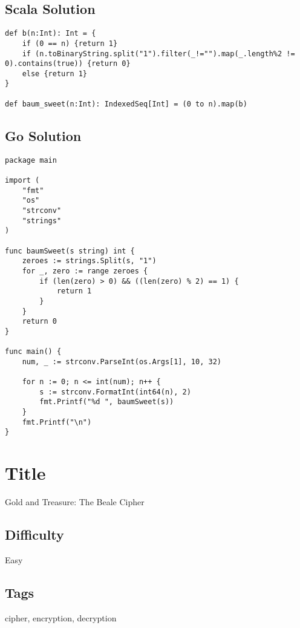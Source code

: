 \subsection{Scala Solution}\label{scala-solution-11}

\begin{verbatim}
def b(n:Int): Int = {
    if (0 == n) {return 1}
    if (n.toBinaryString.split("1").filter(_!="").map(_.length%2 != 0).contains(true)) {return 0}
    else {return 1}
}

def baum_sweet(n:Int): IndexedSeq[Int] = (0 to n).map(b)
\end{verbatim}

\subsection{Go Solution}\label{go-solution}

\begin{verbatim}
package main

import (
    "fmt"
    "os"
    "strconv"
    "strings"
)

func baumSweet(s string) int {
    zeroes := strings.Split(s, "1")
    for _, zero := range zeroes {
        if (len(zero) > 0) && ((len(zero) % 2) == 1) {
            return 1
        }
    }
    return 0
}

func main() {
    num, _ := strconv.ParseInt(os.Args[1], 10, 32)

    for n := 0; n <= int(num); n++ {
        s := strconv.FormatInt(int64(n), 2)
        fmt.Printf("%d ", baumSweet(s))
    }
    fmt.Printf("\n")
}
\end{verbatim}

\section{Title}\label{title-17}

Gold and Treasure: The Beale Cipher

\subsection{Difficulty}\label{difficulty-16}

Easy

\subsection{Tags}\label{tags-17}

cipher, encryption, decryption

